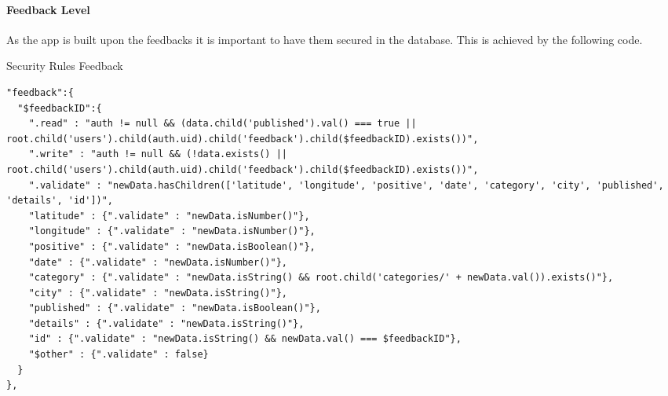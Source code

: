 \paragraph{Feedback Level} \label{par:sec_rule_feedback}
As the app is built upon the feedbacks it is important to have them secured in the database. This is achieved by the following code.

\begin{listing}[H]
  \caption{Security Rules Feedback}
  \label{mint:sec_rule_feedback}
  \begin{verbatim}
"feedback":{
  "$feedbackID":{
    ".read" : "auth != null && (data.child('published').val() === true || root.child('users').child(auth.uid).child('feedback').child($feedbackID).exists())",
    ".write" : "auth != null && (!data.exists() || root.child('users').child(auth.uid).child('feedback').child($feedbackID).exists())",
    ".validate" : "newData.hasChildren(['latitude', 'longitude', 'positive', 'date', 'category', 'city', 'published', 'details', 'id'])",
    "latitude" : {".validate" : "newData.isNumber()"},
    "longitude" : {".validate" : "newData.isNumber()"},
    "positive" : {".validate" : "newData.isBoolean()"},
    "date" : {".validate" : "newData.isNumber()"},
    "category" : {".validate" : "newData.isString() && root.child('categories/' + newData.val()).exists()"},
    "city" : {".validate" : "newData.isString()"},
    "published" : {".validate" : "newData.isBoolean()"},
    "details" : {".validate" : "newData.isString()"},
    "id" : {".validate" : "newData.isString() && newData.val() === $feedbackID"},
    "$other" : {".validate" : false}
  }
},
  \end{verbatim}
\end{listing}

